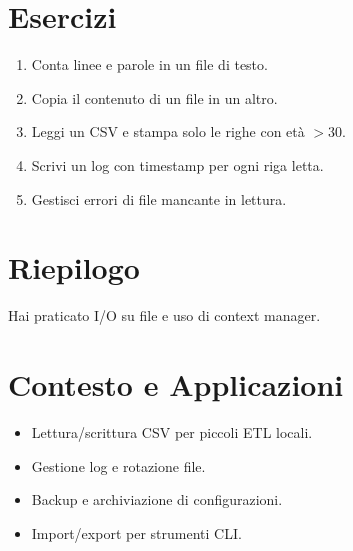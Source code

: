 \section{Esercizi}
\begin{enumerate}
  \item Conta linee e parole in un file di testo.
  \item Copia il contenuto di un file in un altro.
  \item Leggi un CSV e stampa solo le righe con età \(> 30\).
  \item Scrivi un log con timestamp per ogni riga letta.
  \item Gestisci errori di file mancante in lettura.
\end{enumerate}

\section{Riepilogo}
Hai praticato I/O su file e uso di context manager.

\section{Contesto e Applicazioni}
\begin{tcolorbox}[title=Contesto e Applicazioni]
\begin{itemize}
  \item Lettura/scrittura CSV per piccoli ETL locali.
  \item Gestione log e rotazione file.
  \item Backup e archiviazione di configurazioni.
  \item Import/export per strumenti CLI.
\end{itemize}
\end{tcolorbox}

